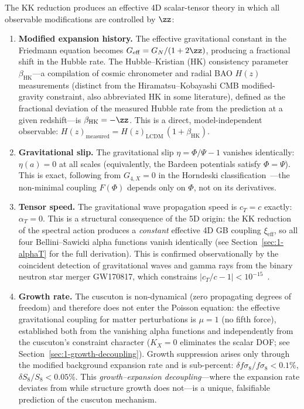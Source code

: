 The KK reduction produces an effective 4D scalar-tensor theory in which all observable modifications are controlled by $\zz$:
\begin{enumerate}
\item \textbf{Modified expansion history.} The effective gravitational constant in the Friedmann equation becomes $G_{\mathrm{eff}} = G_N/(1 + 2\zz)$, producing a fractional shift in the Hubble rate. The Hubble--Kristian (HK) consistency parameter $\beta_{\mathrm{HK}}$---a compilation of cosmic chronometer and radial BAO $H(z)$ measurements (distinct from the Hiramatsu--Kobayashi CMB modified-gravity constraint, also abbreviated HK in some literature), defined as the fractional deviation of the measured Hubble rate from the \LCDM{} prediction at a given redshift---is $\beta_{\mathrm{HK}} = -\zz$. This is a direct, model-independent observable: $H(z)_{\mathrm{measured}} = H(z)_{\mathrm{\scriptscriptstyle LCDM}}\,(1 + \beta_{\mathrm{HK}})$.

\item \textbf{Gravitational slip.} The gravitational slip $\eta = \Phi/\Psi - 1$ vanishes identically: $\eta(a) = 0$ at all scales (equivalently, the Bardeen potentials satisfy $\Phi = \Psi$). This is exact, following from $G_{4,X} = 0$ in the Horndeski classification~\cite{ch1:horndeski74}---the non-minimal coupling $F(\Phi)$ depends only on $\Phi$, not on its derivatives.

\item \textbf{Tensor speed.} The gravitational wave propagation speed is $c_T = c$ exactly: $\alpha_T = 0$. This is a structural consequence of the 5D origin: the KK reduction of the spectral action produces a \emph{constant} effective 4D GB coupling $\xi_{\mathrm{eff}}$, so all four Bellini--Sawicki alpha functions vanish identically (see Section~\ref{sec:1-alphaT} for the full derivation). This is confirmed observationally by the coincident detection of gravitational waves and gamma rays from the binary neutron star merger GW170817, which constrains $|c_T/c - 1| < 10^{-15}$~\cite{ch1:gw170817,ch1:creminelli17,ch1:ezquiaga17}.

\item \textbf{Growth rate.} The cuscuton is non-dynamical (zero propagating degrees of freedom) and therefore does not enter the Poisson equation: the effective gravitational coupling for matter perturbations is $\mu = 1$ (no fifth force), established both from the vanishing alpha functions and independently from the cuscuton's constraint character ($K_X = 0$ eliminates the scalar DOF; see Section~\ref{sec:1-growth-decoupling}). Growth suppression arises only through the modified background expansion rate and is sub-percent: $\delta f\sigma_8 / f\sigma_8 < 0.1\%$, $\delta S_8 / S_8 < 0.05\%$. This \emph{growth--expansion decoupling}---where the expansion rate deviates from \LCDM{} while structure growth does not---is a unique, falsifiable prediction of the cuscuton mechanism.
\end{enumerate}

